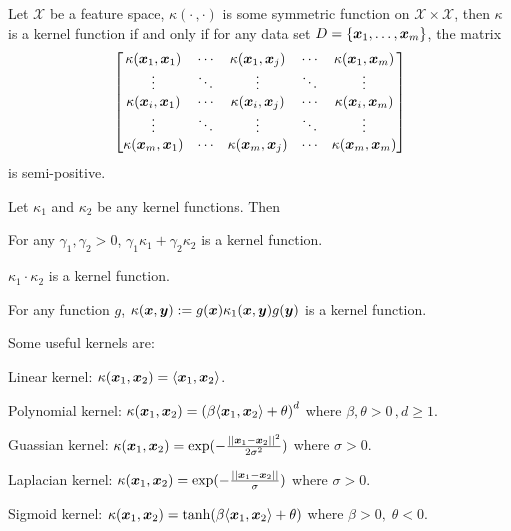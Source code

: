 \begin{thm}
    Let $\mathcal{X}$ be a feature space, $\kappa(\cdot\,, \cdot)$ is some symmetric function on 
    $\mathcal{X} \times \mathcal{X}$, then $\kappa$ is a kernel function if and only if for any data set
    $D = \{\boldsymbol{x}_1, \dotsc, \boldsymbol{x}_m\}$, the matrix
    \begin{equation*}
        \begin{bmatrix}
            \kappa(\boldsymbol{x}_1, \boldsymbol{x}_1) &\cdots &\kappa(\boldsymbol{x}_1, \boldsymbol{x}_j) &\cdots &\kappa(\boldsymbol{x}_1, \boldsymbol{x}_m)\\
            \vdots                   &\ddots &\vdots                   &\ddots &\vdots\\
            \kappa(\boldsymbol{x}_i, \boldsymbol{x}_1) &\cdots &\kappa(\boldsymbol{x}_i, \boldsymbol{x}_j) &\cdots &\kappa(\boldsymbol{x}_i, \boldsymbol{x}_m)\\
            \vdots                   &\ddots &\vdots                   &\ddots &\vdots\\
            \kappa(\boldsymbol{x}_m, \boldsymbol{x}_1) &\cdots &\kappa(\boldsymbol{x}_m, \boldsymbol{x}_j) &\cdots &\kappa(\boldsymbol{x}_m, \boldsymbol{x}_m)
        \end{bmatrix}
    \end{equation*}
    is semi-positive.
\end{thm}

\begin{prop}
    Let $\kappa_1$ and $\kappa_2$ be any kernel functions. Then
    \begin{compactenum}
        \item For any $\gamma_1, \gamma_2 > 0$, $\gamma_1 \kappa_1 + \gamma_2 \kappa_2$ is a kernel function.
        \item $\kappa_1 \cdot \kappa_2$ is a kernel function.
        \item For any function $g$, $\kappa(\boldsymbol{x}, \boldsymbol{y}) := g(\boldsymbol{x})\kappa_1(\boldsymbol{x}, \boldsymbol{y})g(\boldsymbol{y})$ is a 
        kernel function.
    \end{compactenum}
\end{prop}
Some useful kernels are:
\begin{compactenum}
    \item Linear kernel: $\kappa(\boldsymbol{x}_1, \boldsymbol{x}_2) = \langle \boldsymbol{x}_1, \boldsymbol{x}_2 \rangle$.
    \item Polynomial kernel: $\kappa(\boldsymbol{x}_1, \boldsymbol{x}_2) = {\left(\beta\langle \boldsymbol{x}_1, \boldsymbol{x}_2 \rangle + \theta\right)}^d$ 
    where $\beta, \theta > 0\,,d \geqslant 1$.
    \item Guassian kernel: $\kappa(\boldsymbol{x}_1, \boldsymbol{x}_2) = \exp(-\frac{||\boldsymbol{x}_1 - \boldsymbol{x}_2||^2}{2\sigma^2})$ where
    $\sigma > 0$.
    \item Laplacian kernel: $\kappa(\boldsymbol{x}_1, \boldsymbol{x}_2) = \exp(-\frac{||\boldsymbol{x}_1 - \boldsymbol{x}_2||}{\sigma})$ where
    $\sigma > 0$.
    \item Sigmoid kernel: $\kappa(\boldsymbol{x}_1, \boldsymbol{x}_2) = \tanh(\beta \langle \boldsymbol{x}_1, \boldsymbol{x}_2\rangle + \theta)$
    where $\beta > 0,\;\theta < 0$.
\end{compactenum}

